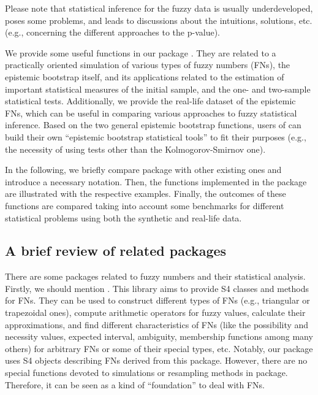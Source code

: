 Please note that statistical inference for the fuzzy data is usually underdeveloped, poses some problems, and leads to discussions about the intuitions, solutions, etc. (e.g., concerning the different approaches to the p-value).

We provide some useful functions in our package .
They are related to a practically oriented simulation of various types of fuzzy numbers (FNs), the epistemic bootstrap itself, and its applications related to the estimation of important statistical measures of the initial sample, and the one- and two-sample statistical tests.
Additionally, we provide the real-life dataset of the epistemic FNs, which can be useful in comparing various approaches to fuzzy statistical inference.
Based on the two general epistemic bootstrap functions, users of  can build their own ``epistemic bootstrap statistical tools'' to fit their purposes (e.g., the necessity of using tests other than the Kolmogorov-Smirnov one).

In the following, we briefly compare  package with other existing ones and introduce a necessary notation.
Then, the functions implemented in the package are illustrated with the respective examples.
Finally, the outcomes of these functions are compared taking into account some benchmarks for different statistical problems using both the synthetic and real-life data. 



  
\subsection{A brief review of related packages}

There are some packages related to fuzzy numbers and their statistical analysis.
Firstly, we should mention  \citep{FuzzyNumbersMan}.
This library aims to provide S4 classes and methods for FNs.
They can be used to construct different types of FNs (e.g., triangular or trapezoidal ones), compute arithmetic operators for fuzzy values, calculate their approximations, and find different characteristics of FNs (like the possibility and necessity values, expected interval, ambiguity, membership functions among many others) for arbitrary FNs or some of their special types, etc.
Notably, our package  uses S4 objects describing FNs derived from this package.
However, there are no special functions devoted to simulations or resampling methods in  package.
Therefore, it can be seen as a kind of ``foundation'' to deal with FNs.

